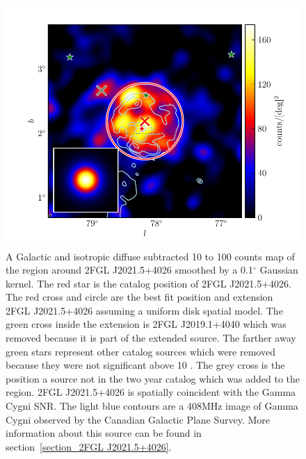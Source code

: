 \documentclass[12pt,preprint]{aastex}
\newcommand{\gev}{\text{GeV}\xspace}
\renewcommand{\deg}{\ensuremath{^\circ}\xspace}
\begin{document}
\begin{figure}
  \begin{center}
    \includegraphics[type=pdf,ext=.pdf,read=.pdf]{source_plots/source_Gamma_Cygni}
  \end{center}
  \caption{A Galactic and isotropic diffuse subtracted 10 \gev to 100
  \gev counts map of the region around 2FGL J2021.5+4026 smoothed by a
  0.1\deg Gaussian kernel. The red star is the catalog position of 2FGL
  J2021.5+4026.  The red cross and circle are the best fit position and
  extension 2FGL J2021.5+4026 assuming a uniform disk spatial model.
  The green cross inside the extension is 2FGL J2019.1+4040 which
  was removed because it is part of the extended source.  The farther
  away green stars represent other catalog sources which were removed
  because they were not significant above 10 \gev.  The grey cross is
  the position a source not in the two year catalog which was added
  to the region. 2FGL J2021.5+4026 is spatially coincident with the
  Gamma Cygni SNR.  The light blue contours are a 408MHz image of Gamma Cygni
  observed by the Canadian Galactic Plane Survey.  More information about
  this source can be found in section~\ref{section_2FGL J2021.5+4026}.
  }\label{1FGL_J2020.0+4049}
\end{figure}
\end{document}
